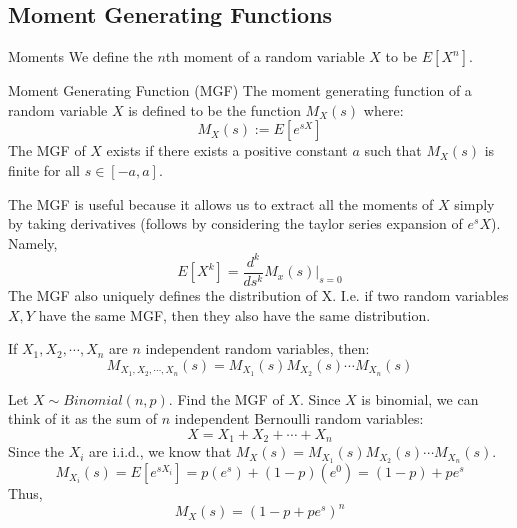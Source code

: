 \subsection{Moment Generating Functions}
\begin{defn}{Moments}{}
We define the \(n\)th moment of a random variable \(X\) to be \(E[X^n]\).
\end{defn}
\begin{defn}{Moment Generating Function (MGF)}{}
The moment generating function of a random variable \(X\) is defined to be the function \(M_X(s)\) where: \newline 
\begin{equation*}
  M_X(s) := E[e^{sX}]
\end{equation*}
The MGF of \(X\) exists if there exists a positive constant \(a\) such that \(M_X(s)\) is finite for all \(s \in [-a, a]\).
\end{defn}
The MGF is useful because it allows us to extract all the moments of \(X\) simply by taking derivatives (follows by considering the taylor series expansion of \(e^sX\)). Namely,
\begin{equation*}
  E[X^k] = \frac{d^k}{ds^k}M_x(s)|_{s=0} 
\end{equation*}
The MGF also uniquely defines the distribution of X. I.e. if two random variables \(X,Y\) have the same MGF, then they also have the same distribution.


\begin{thm}{}{}
If \(X_1, X_2, \cdots, X_n\) are \(n\) independent random variables, then: \newline 
\begin{equation*}
  M_{X_1, X_2, \cdots, X_n}(s) = M_{X_1}(s)M_{X_2}(s)\cdots M_{X_n}(s)
\end{equation*}
\end{thm}

\begin{exmp}{}{}
Let \(X \sim Binomial(n, p).\) Find the MGF of \(X\).\newline 
Since \(X\) is binomial, we can think of it as the sum of \(n\) independent Bernoulli random variables:
\begin{equation*}
  X = X_1 + X_2 + \cdots + X_n
\end{equation*}
Since the \(X_i\) are i.i.d., we know that \(M_{X}(s) = M_{X_1}(s)M_{X_2}(s)\cdots M_{X_n}(s)\). \newline 
\begin{equation*}
  M_{X_i}(s) = E[e^{sX_i}] = p(e^{s}) + (1-p)(e^{0}) = (1-p) + pe^s
\end{equation*}
Thus,
\begin{equation*}
  M_X(s) = (1 - p + pe^s)^n
\end{equation*}

\end{exmp}

